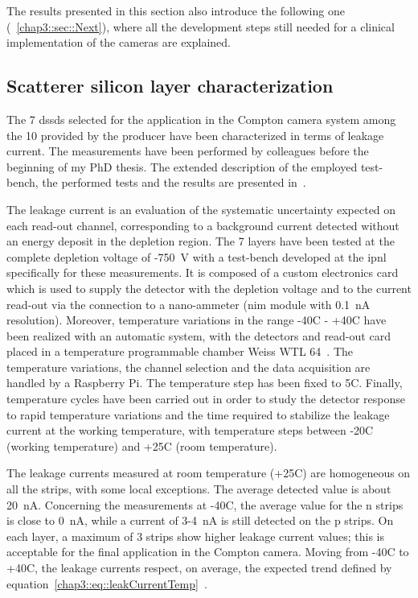 The results presented in this section also introduce the following one (~\ref{chap3::sec::Next}), where all the development steps still needed for a clinical implementation of the cameras are explained.


\subsection{Scatterer silicon layer characterization}\label{chap3::subsec::scattSichar}

The 7 \glspl{dssd} selected for the application in the Compton camera system among the 10 provided by the producer have been characterized in terms of leakage current. The measurements have been performed by colleagues before the beginning of my PhD thesis. The extended description of the employed test-bench, the performed tests and the results are presented in~\cite{Ley2015}.

The leakage current is an evaluation of the systematic uncertainty expected on each read-out channel, corresponding to a background current detected without an energy deposit in the depletion region. The 7 layers have been tested at the complete depletion voltage of -750~V with a test-bench developed at the \gls{ipnl} specifically for these measurements. It is composed of a custom electronics card which is used to supply the detector with the depletion voltage and to the current read-out via the connection to a nano-ammeter (\gls{nim} module with 0.1~nA resolution).  Moreover, temperature variations in the range -40\textdegree{}C - +40\textdegree{}C have been realized with an automatic system, with the detectors and read-out card placed in a temperature programmable chamber Weiss WTL 64~\parencite{WeissTechnik2017}. The temperature variations, the channel selection and the data acquisition are handled by a Raspberry Pi. The temperature step has been fixed to 5\textdegree{}C. Finally, temperature cycles have been carried out in order to study the detector response to rapid temperature variations and the time required to stabilize the leakage current at the working temperature, with temperature steps between -20\textdegree{}C (working temperature) and +25\textdegree{}C (room temperature).

The leakage currents measured at room temperature (+25\textdegree{}C) are homogeneous on all the strips, with some local exceptions. The average detected value is about 20~nA. Concerning the measurements at -40\textdegree{}C, the average value for the n strips is close to 0~nA, while a current of 3-4~nA is still detected on the p strips. On each layer, a maximum of 3 strips show higher leakage current values; this is acceptable for the final application in the Compton camera. Moving from -40\textdegree{}C to +40\textdegree{}C, the leakage currents respect, on average, the expected trend defined by equation~\ref{chap3::eq::leakCurrentTemp}~\parencite{Spieler1998}.


